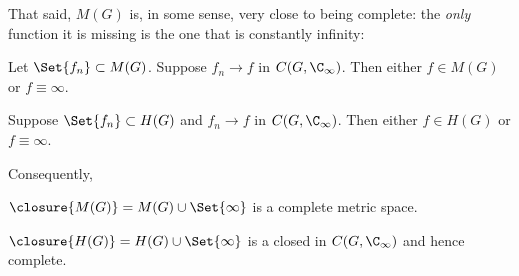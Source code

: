 That said, $M(G)$ is, in some sense, very close to being complete: the \emph{only} function it is missing is the one that is constantly infinity:

\begin{theorem}\label{thm7.13}
	\begin{items}
		\item Let $\Set{f_n} \subset M(G)$.
		Suppose $f_n \to f$ in $C(G, \C_\infty)$.
		Then either $f \in M(G)$ or $f \equiv \infty$.
		\item Suppose $\Set{f_n} \subset H(G)$ and $f_n \to f$ in $C(G, \C_\infty)$.
		Then either $f \in H(G)$ or $f \equiv \infty$.
	\end{items}
\end{theorem}

Consequently,

\begin{corollary}\label{cor7.14}
	$\closure{M(G)} = M(G) \cup \Set{\infty}$ is a complete metric space.
\end{corollary}

\begin{corollary}\label{cor7.15}
	$\closure{H(G)} = H(G) \cup \Set{\infty}$ is a closed in $C(G, \C_\infty)$ and hence complete.
\end{corollary}
